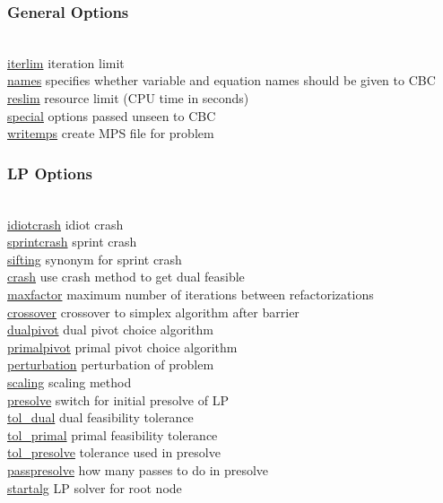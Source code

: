 
\subsubsection{General Options}
\begin{tabbing}
\hspace {1.3in} \= \\
\hyperlink{iterlim}
{iterlim} \> iteration limit \\
\hyperlink{names}
{names} \> specifies whether variable and equation names should be given to CBC \\
\hyperlink{reslim}
{reslim} \> resource limit (CPU time in seconds)\\
\hyperlink{special}
{special} \> options passed unseen to CBC \\
\hyperlink{writemps}
{writemps} \> create MPS file for problem
\end{tabbing}

\subsubsection{LP Options}
\begin{tabbing}
\hspace {1.3in} \= \\
\hyperlink{idiotcrash}
{idiotcrash} \> idiot crash \\
\hyperlink{sprintcrash}
{sprintcrash} \> sprint crash \\
\hyperlink{sifting}
{sifting} \> synonym for sprint crash \\
\hyperlink{crash}
{crash} \> use crash method to get dual feasible \\
\hyperlink{maxfactor}
{maxfactor} \> maximum number of iterations between refactorizations \\
\hyperlink{crossover}
{crossover} \> crossover to simplex algorithm after barrier \\
\hyperlink{dualpivot}
{dualpivot} \> dual pivot choice algorithm \\
\hyperlink{primalpivot}
{primalpivot} \> primal pivot choice algorithm \\
\hyperlink{perturbation}
{perturbation} \> perturbation of problem \\
\hyperlink{scaling}
{scaling} \> scaling method \\
\hyperlink{presolve}
{presolve} \> switch for initial presolve of LP \\
\hyperlink{tol_dual}
{tol\_dual} \> dual feasibility tolerance \\
\hyperlink{tol_primal}
{tol\_primal} \> primal feasibility tolerance \\
\hyperlink{tol_presolve}
{tol\_presolve} \> tolerance used in presolve \\
\hyperlink{passpresolve}
{passpresolve} \> how many passes to do in presolve \\
\hyperlink{startalg}
{startalg} \> LP solver for root node
\end{tabbing}


